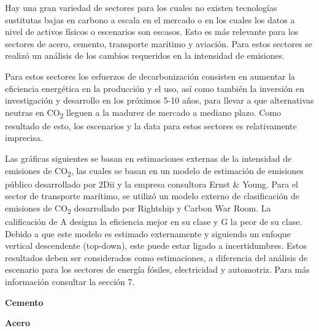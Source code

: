 \documentclass[10pt,table]{article}\usepackage[]{graphicx}\usepackage[]{color}
\begin{document}
	\begin{multicols}{2}
		Hay una gran variedad de sectores para los cuales no existen tecnologías sustitutas bajas en carbono a escala en el mercado o en los cuales los datos a nivel de activos físicos o escenarios son escasos.  Esto es más relevante para los sectores de acero, cemento, transporte marítimo y aviación. Para estos sectores se realizó un análisis de los cambios requeridos en la intensidad de emisiones. 
	
		Para estos sectores los esfuerzos de decarbonización consisten en aumentar la eficiencia energética en la producción y el uso, así como también la inversión en investigación y desarrollo en los próximos 5-10 años, para llevar a que alternativas neutras en CO\textsubscript{2} lleguen a la madurez de mercado a mediano plazo. Como resultado de esto, los escenarios y la data para estos sectores es relativamente imprecisa.
		
		
		Las gráficas siguientes se basan en estimaciones externas de la intensidad de emisiones de CO\textsubscript{2}, las cuales se basan en un modelo de estimación de emisiones público desarrollado por 2Dii y la empresa consultora Ernst \& Young. Para el sector de transporte marítimo, se utilizó un modelo externo de clasificación de emisiones de CO\textsubscript{2} desarrollado por Rightship y Carbon War Room. La calificación de A designa la eficiencia mejor en su clase y G la peor de su clase. Debido a que este modelo es estimado externamente y siguiendo un enfoque vertical descendente (top-down), este puede estar ligado a incertidumbres. Estos resultados deben ser considerados como estimaciones, a diferencia del análisis de escenario para los sectores de energía fósiles, electricidad y automotriz. Para más información consultar la sección 7.
		
	\end{multicols}
	
	\begin{multicols}{2}
		
		\textbf{Cemento}
		
		\textbf{Acero}
		
	\end{multicols}
	
	\setlength\multicolsep{0pt}
	\vspace{0cm}
	
\end{document}
